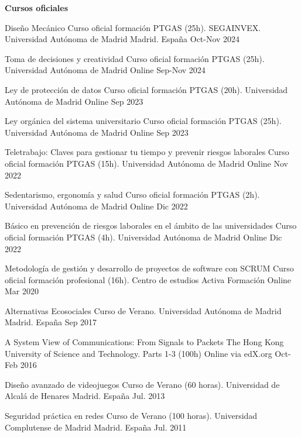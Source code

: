 \textbf{Cursos oficiales}
\begin{cvhonors}
  \cvhonor
	{Diseño Mecánico} %
	{Curso oficial formación PTGAS (25h). SEGAINVEX. Universidad Autónoma de Madrid} %
	{Madrid. España} %
	{Oct-Nov 2024} %
    
   \cvhonor
	{Toma de decisiones y creatividad} %
	{Curso oficial formación PTGAS (25h). Universidad Autónoma de Madrid} %
	{Online} %
	{Sep-Nov 2024} %
	
   \cvhonor
	{Ley de protección de datos} %
	{Curso oficial formación PTGAS (20h). Universidad Autónoma de Madrid} %
	{Online} %
	{Sep 2023} %
	
   \cvhonor
	{Ley orgánica del sistema universitario} %
	{Curso oficial formación PTGAS (25h). Universidad Autónoma de Madrid} %
	{Online} %
	{Sep 2023} %

   \cvhonor
	{Teletrabajo: Claves para gestionar tu tiempo y prevenir riesgos laborales} %
	{Curso oficial formación PTGAS (15h). Universidad Autónoma de Madrid} %
	{Online} %
	{Nov 2022} %
	
   \cvhonor
	{Sedentarismo, ergonomía y salud} %
	{Curso oficial formación PTGAS (2h). Universidad Autónoma de Madrid} %
	{Online} %
	{Dic 2022} %

   \cvhonor
	{Básico en prevención de riesgos laborales en el ámbito de las universidades} %
	{Curso oficial formación PTGAS (4h). Universidad Autónoma de Madrid} %
	{Online} %
	{Dic 2022} %

   \cvhonor
	{Metodología de gestión y desarrollo de proyectos de software con SCRUM} %
	{Curso oficial formación profesional (16h). Centro de estudios Activa Formación} %
	{Online} %
	{Mar 2020} %

   \cvhonor
	{Alternativas Ecosociales} %
	{Curso de Verano. Universidad Autónoma de Madrid}
	{Madrid. España} %
	{Sep 2017} %

   \cvhonor
	{A System View of Communications: From Signals to Packets} %
	{The Hong Kong University of Science and Technology. Parts 1-3 (100h)}
	{Online via edX.org} %
	{Oct-Feb 2016} %

   \cvhonor
	{Diseño avanzado de videojuegos} %
	{Curso de Verano (60 horas). Universidad de Alcalá de Henares}
	{Madrid. España} %
	{Jul. 2013} %
	
   \cvhonor
	{Seguridad práctica en redes} %
	{Curso de Verano (100 horas). Universidad Complutense de Madrid}
	{Madrid. España} %
	{Jul. 2011} %
\end{cvhonors}

